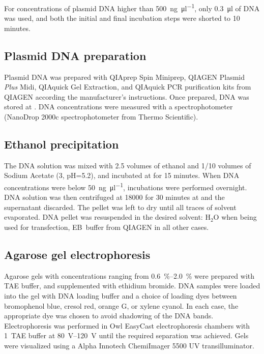       For concentrations of plasmid DNA higher than \SI{500}{\ng\per\ul}, only
      \SI{0.3}{\ul} of DNA was used, and both the initial and final incubation
      steps were shorted to 10 minutes.

    \subsection{Plasmid DNA preparation}
      Plasmid DNA was prepared with QIAprep Spin Miniprep,
      QIAGEN Plasmid \textit{Plus} Midi, QIAquick Gel Extraction, and QIAquick
      PCR purification kits from QIAGEN
      according the manufacturer's instructions.
      Once prepared, DNA was stored at .
      DNA concentrations were measured
      with a spectrophotometer (NanoDrop 2000c spectrophotometer from
      Thermo Scientific).

    \subsection{Ethanol precipitation}
      \label{sec:ethanol-precipitation}
      The DNA solution was mixed with \num{2.5} volumes of  ethanol
      and \num{1/10} volumes of Sodium Acetate (\SI{3}{\Molar}, pH=\num{5.2}),
      and incubated at  for 15 minutes. When DNA concentrations were below
      \SI{50}{\ng\per\ul}, incubations were performed overnight.
      DNA solution was then centrifuged at
      \SI{18000}{\gn} for 30 minutes at  and the supernatant discarded.
      The pellet was left to dry until all traces of solvent evaporated.
      DNA pellet
      was resuspended in the desired solvent:
      H$_2$O when being used for transfection,
      EB~buffer from QIAGEN in all other cases.

    \subsection{Agarose gel electrophoresis}
      Agarose gels with concentrations ranging from \SIrange{0.6}{2.0}{\percent}
      were prepared with TAE buffer, and supplemented with ethidium bromide.
      DNA samples were loaded into the gel with DNA loading buffer and a
      choice of loading dyes between bromophenol blue, cresol red, orange G, or
      xylene cyanol.  In each case, the appropriate dye was chosen
      to avoid shadowing of the DNA bands. Electrophoresis was
      performed in Owl EasyCast electrophoresis chambers with
      \SI{1}{\X}~TAE buffer at
      \SIrange{80}{120}{\volt} until the required separation was achieved.
      Gels were visualized using a
      Alpha Innotech ChemiImager 5500 UV transilluminator.


